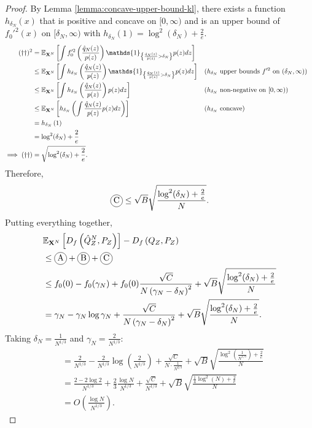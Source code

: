 \begin{proof}
By Lemma \ref{lemma:concave-upper-bound-kl}, there exists a function $h_{\delta_N}(x)$ that is positive and concave on $[0, \infty)$ and is an upper bound of $f_0'^2(x)$ on $[\delta_N, \infty)$ with $h_{\delta_N}(1) = \log^2(\delta_N) + \frac{2}{e}$.
%
\begin{align*}
    (\dagger\dagger)^2 
    &= \E_{\XN} \left[\int f_0'^2\left(\frac{\hat{q}_N(z)}{p(z)} \right) \mathds{1}_{\left\lbrace \frac{\hat{q}_N(z)}{p(z)} > \delta_N \right\rbrace} p(z) dz \right]
    \\
    &\leq \E_{\XN} \left[ \int h_{\delta_N}\left(\frac{\hat{q}_N(z)}{p(z)} \right) \mathds{1}_{\left\lbrace \frac{\hat{q}_N(z)}{p(z)} > \delta_N \right\rbrace} p(z) dz \right]
    && \text{($h_{\delta_N}$ upper bounds $f'^2$ on $(\delta_N, \infty)$)}
    \\
    &\leq \E_{\XN}\left[ \int h_{\delta_N}\left(\frac{\hat{q}_N(z)}{p(z)} \right) p(z) dz \right]
    && \text{($h_{\delta_N}$ non-negative on $[0, \infty)$)}
    \\
    &\leq \E_{\XN} \left[ h_{\delta_N}\left( \int \frac{\hat{q}_N(z)}{p(z)} p(z) dz \right)  \right]
    && \text{($h_{\delta_N}$ concave)}
    \\
    &=  h_{\delta_N}\left( 1\right) \\
    &= \log^2(\delta_N) + \frac{2}{e} \\
    \implies (\dagger\dagger)&= \sqrt{\log^2(\delta_N) + \frac{2}{e}}.
\end{align*}
%
Therefore,
\begin{align*}
    \encircle{C} \leq \sqrt{B} \sqrt{\frac{\log^2(\delta_N) + \frac{2}{e}}{N}}.
\end{align*}
%
Putting everything together,
%
\begin{align*}
    &\E_{\XN} \left[ D_f\left( \hat{Q}_Z^N , P_Z\right)\right] - D_f\left( Q_{Z} , P_Z\right)\\
    &\leq \encircle{A} + \encircle{B} + \encircle{C} \\
    &\leq f_0(0) - f_0(\gamma_N) + f_0(0) \frac{\sqrt{C}}{N \left( \gamma_N - \delta_N \right)^2} + \sqrt{B} \sqrt{\frac{\log^2(\delta_N) + \frac{2}{e}}{N}}\\
    &= \gamma_N - \gamma_N \log \gamma_N  + \frac{\sqrt{C}}{N \left( \gamma_N - \delta_N \right)^2} + \sqrt{B} \sqrt{\frac{\log^2(\delta_N) + \frac{2}{e}}{N}}.
\end{align*}
Taking $\delta_N = \frac{1}{N^{1/3}}$ and $\gamma_N = \frac{2}{N^{1/3}}$:
\begin{align*}
    &=\frac{2}{N^{1/3}} - \frac{2}{N^{1/3}} \log\left( \frac{2}{N^{1/3}}\right) + \frac{ \sqrt{C} }{N \cdot \frac{1}{N^{2/3}} } + \sqrt{B} \sqrt{\frac{\log^2\left(\frac{1}{N^{1/3}}\right) + \frac{2}{e}}{N}}\\
    &= \frac{ 2 - 2\log2}{N^{1/3}} + \frac{2}{3}\frac{\log N}{N^{1/3}} + \frac{\sqrt{C}}{N^{1/3}} + \sqrt{B} \sqrt{\frac{\frac{1}{4}\log^2\left(N\right) + \frac{2}{e}}{N}} \\
    & = O\left( \frac{\log N}{N^{1/3}}\right).
\end{align*}



\end{proof}
